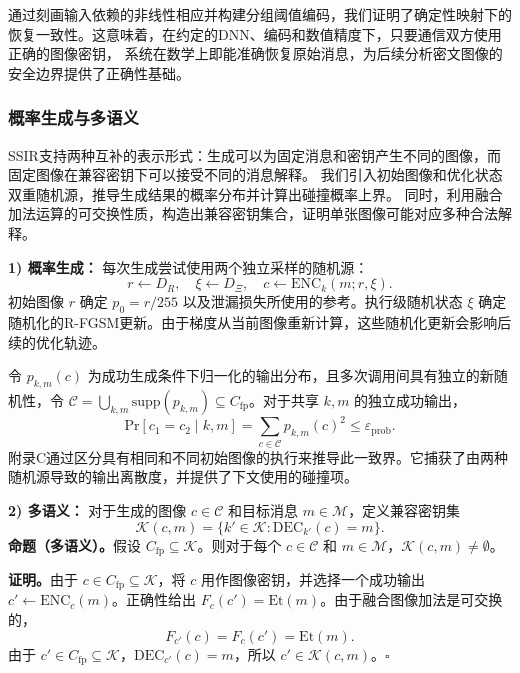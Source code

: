 通过刻画输入依赖的非线性相应并构建分组阈值编码，我们证明了确定性映射下的恢复一致性。这意味着，在约定的DNN、编码和数值精度下，只要通信双方使用正确的图像密钥，
系统在数学上即能准确恢复原始消息，为后续分析密文图像的安全边界提供了正确性基础。
\subsubsection{概率生成与多语义}

SSIR支持两种互补的表示形式：生成可以为固定消息和密钥产生不同的图像，而固定图像在兼容密钥下可以接受不同的消息解释。
我们引入初始图像和优化状态双重随机源，推导生成结果的概率分布并计算出碰撞概率上界。
同时，利用融合加法运算的可交换性质，构造出兼容密钥集合，证明单张图像可能对应多种合法解释。

\textbf{1) 概率生成：}
每次生成尝试使用两个独立采样的随机源：
\begin{equation}
r \leftarrow D_R, \quad \xi \leftarrow D_\Xi, \quad c \leftarrow \mathrm{ENC}_k(m; r, \xi). \tag{13}
\end{equation}
初始图像 \(r\) 确定 \(p_0 = r/255\) 以及泄漏损失所使用的参考。执行级随机状态 \(\xi\) 确定随机化的R-FGSM更新。由于梯度从当前图像重新计算，这些随机化更新会影响后续的优化轨迹。

令 \(p_{k,m}(c)\) 为成功生成条件下归一化的输出分布，且多次调用间具有独立的新随机性，令 \(\mathcal{C} = \bigcup_{k,m} \mathrm{supp}(p_{k,m}) \subseteq C_{\mathrm{fp}}\)。对于共享 \(k, m\) 的独立成功输出，
\begin{equation}
\mathrm{Pr}[c_1 = c_2 \mid k, m] = \sum_{c \in \mathcal{C}} p_{k,m}(c)^2 \le \varepsilon_{\mathrm{prob}}. \tag{14}
\end{equation}
附录C通过区分具有相同和不同初始图像的执行来推导此一致界。它捕获了由两种随机源导致的输出离散度，并提供了下文使用的碰撞项。

\textbf{2) 多语义：}
对于生成的图像 \(c \in \mathcal{C}\) 和目标消息 \(m \in \mathcal{M}\)，定义兼容密钥集
\begin{equation}
\mathcal{K}(c, m) = \{ k' \in \mathcal{K} : \mathrm{DEC}_{k'}(c) = m \}. \tag{15}
\end{equation}
\textbf{命题（多语义）。}假设 \(C_{\mathrm{fp}} \subseteq \mathcal{K}\)。则对于每个 \(c \in \mathcal{C}\) 和 \(m \in \mathcal{M}\)，\(\mathcal{K}(c, m) \neq \emptyset\)。

\textbf{证明。}由于 \(c \in C_{\mathrm{fp}} \subseteq \mathcal{K}\)，将 \(c\) 用作图像密钥，并选择一个成功输出 \(c' \leftarrow \mathrm{ENC}_c(m)\)。正确性给出 \(F_c(c') = \mathrm{Et}(m)\)。由于融合图像加法是可交换的，
\begin{equation}
F_{c'}(c) = F_c(c') = \mathrm{Et}(m). \tag{16}
\end{equation}
由于 \(c' \in C_{\mathrm{fp}} \subseteq \mathcal{K}\)，\(\mathrm{DEC}_{c'}(c) = m\)，所以 \(c' \in \mathcal{K}(c, m)\)。\(\square\)

